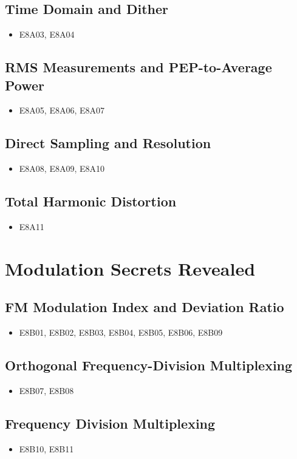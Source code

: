 \documentclass{book}
\begin{document}
\subsection{Time Domain and Dither}
\begin{itemize}
    \item E8A03, E8A04
\end{itemize}
\subsection{RMS Measurements and PEP-to-Average Power}
\begin{itemize}
    \item E8A05, E8A06, E8A07
\end{itemize}
\subsection{Direct Sampling and Resolution}
\begin{itemize}
    \item E8A08, E8A09, E8A10
\end{itemize}
\subsection{Total Harmonic Distortion}
\begin{itemize}
    \item E8A11
\end{itemize}

\section{Modulation Secrets Revealed}
\subsection{FM Modulation Index and Deviation Ratio}
\begin{itemize}
    \item E8B01, E8B02, E8B03, E8B04, E8B05, E8B06, E8B09
\end{itemize}
\subsection{Orthogonal Frequency-Division Multiplexing}
\begin{itemize}
    \item E8B07, E8B08
\end{itemize}
\subsection{Frequency Division Multiplexing}
\begin{itemize}
    \item E8B10, E8B11
\end{itemize}
\end{document}
